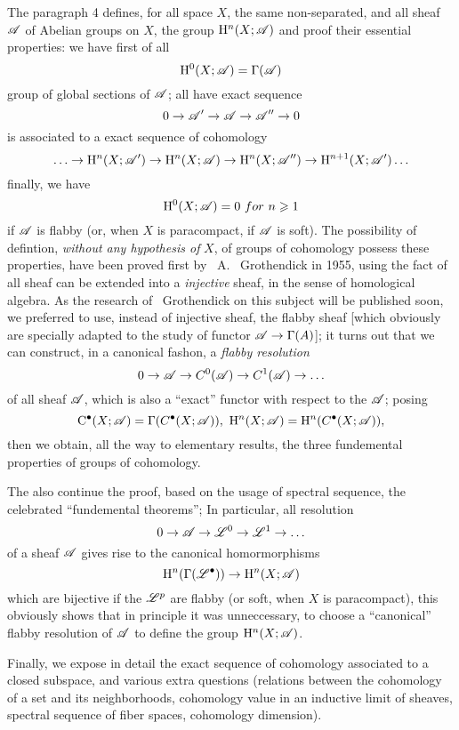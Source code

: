 \oldpage[III]
The paragraph 4 defines, for all space $X$, the same non-separated, and all sheaf $\mathscr{A}$ of Abelian groups on $X$, the group $\mathrm{H}^n(X;\mathscr{A})$ and 
proof their essential properties: we have first of all
\[
    \mathrm{H}^0(X;\mathscr{A}) = \Gamma({\mathscr{A}})
\]
group of global sections of $\mathscr{A}$; all have exact sequence
\[
    0\rightarrow \mathscr{A'} \rightarrow \mathscr{A} \rightarrow \mathscr{A''} \rightarrow 0
\]
is associated to a exact sequence of cohomology
\[
    \ldots\rightarrow \mathrm{H}^n(X;\mathscr{A'}) \rightarrow \mathrm{H}^n(X;\mathscr{A}) \rightarrow \mathrm{H}^n(X;\mathscr{A''}) \rightarrow \mathrm{H}^{n+1}(X;\mathscr{A'}) \ldots
\]
finally, we have
\[
    \mathrm{H}^0(X;\mathscr{A}) = 0\ for\ n\geqslant 1
\]
if $\mathscr{A}$ is flabby (or, when $X$ is paracompact, if $\mathscr{A}$ is soft). 
The possibility of defintion, \emph{without any hypothesis of} $X$, of groups of cohomology possess these properties, 
have been proved first by ~A. ~Grothendick in 1955, using the fact of all sheaf can be extended into a \emph{injective} sheaf, in the sense of homological algebra. 
As the research of ~Grothendick on this subject will be published soon, we preferred to use, instead of injective sheaf, 
the flabby sheaf [which obviously are specially adapted to the study of functor $\mathscr{A}\rightarrow \Gamma({A})$]; 
it turns out that we can construct, in a canonical fashon, a \emph{flabby resolution}
\[
    0\rightarrow \mathscr{A} \rightarrow C^0(\mathscr{A}) \rightarrow C^1(\mathscr{A}) \rightarrow \ldots
\]
of all sheaf $\mathscr{A}$, which is also a ``exact'' functor with respect to the $\mathscr{A}$; posing
\[
    \cx{\CC}(X;\sh{A}) = \Gamma(\cx{C}(X;\sh{A})),\ 
    \HH^n(X;\sh{A}) = \HH^n(\cx{C}(X;\sh{A})),
\]
then we obtain, all the way to elementary results, the three fundemental properties of groups of cohomology.

The  also continue the proof, based on the usage of spectral sequence, the celebrated ``fundemental theorems''; 
In particular, all resolution
\[
    0\rightarrow \mathscr{A} \rightarrow \mathscr{L}^0 \rightarrow \mathscr{L}^1 \rightarrow \ldots
\]
of a sheaf $\mathscr{A}$ gives rise to the canonical homormorphisms
\[
    \mathrm{H}^n(\Gamma({\mathscr{L}}^{\bullet})) \rightarrow \mathrm{H}^n(X;\mathscr{A})
\]
which are bijective if the $\mathscr{L}^p$ are flabby (or soft, when $X$ is paracompact), 
this obviously shows that in principle it was unneccessary, to choose a ``canonical'' flabby resolution of $\mathscr{A}$ to define the group $\mathrm{H}^n(X;\mathscr{A})$.

\oldpage[IV]
Finally, we expose in detail the exact sequence of cohomology associated to a closed subspace, and 
various extra questions 
(relations between the cohomology of a set and its neighborhoods, cohomology value in an inductive limit of sheaves, spectral sequence of fiber spaces, cohomology dimension).

